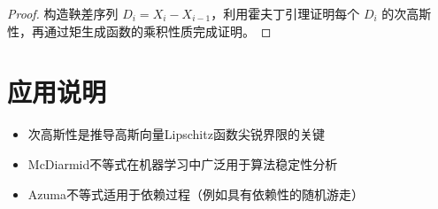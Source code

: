 \documentclass{article}
\theoremstyle{definition}
\newcommand{\1}{\mathbf{1}}
\begin{document}
\begin{proof}
构造鞅差序列 \( D_i = X_i - X_{i-1} \)，利用霍夫丁引理证明每个 \( D_i \) 的次高斯性，再通过矩生成函数的乘积性质完成证明。
\end{proof}

\section{应用说明}
\begin{itemize}
\item 次高斯性是推导高斯向量Lipschitz函数尖锐界限的关键
\item McDiarmid不等式在机器学习中广泛用于算法稳定性分析
\item Azuma不等式适用于依赖过程（例如具有依赖性的随机游走）
\end{itemize}
\end{document}
